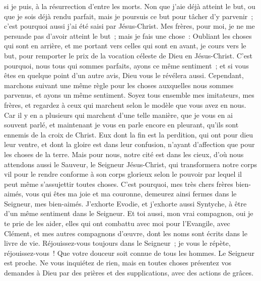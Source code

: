 \begin{multicols}{2}
si je puis, à la résurrection d'entre les morts.
Non que j'aie déjà atteint le but, ou que je sois déjà rendu parfait, mais je poursuis ce but pour tâcher d'y parvenir~; c'est pourquoi aussi j'ai été saisi par Jésus-Christ.
Mes frères, pour moi, je ne me persuade pas d'avoir atteint le but~;
mais je fais une chose~: Oubliant les choses qui sont en arrière, et me portant vers celles qui sont en avant, je cours vers le but, pour remporter le prix de la vocation céleste de Dieu en Jésus-Christ.
C'est pourquoi, nous tous qui sommes parfaits, ayons ce même sentiment~; et si vous êtes en quelque point d'un autre avis, Dieu vous le révélera aussi.
Cependant, marchons suivant une même règle pour les choses auxquelles nous sommes parvenus, et ayons un même sentiment.
Soyez tous ensemble mes imitateurs, mes frères, et regardez à ceux qui marchent selon le modèle que vous avez en nous.
Car il y en a plusieurs qui marchent d'une telle manière, que je vous en ai souvent parlé, et maintenant je vous en parle encore en pleurant, qu'ils sont ennemis de la croix de Christ.
Eux dont la fin est la perdition, qui ont pour dieu leur ventre, et dont la gloire est dans leur confusion, n'ayant d'affection que pour les choses de la terre.
Mais pour nous, notre cité est dans les cieux, d'où nous attendons aussi le Sauveur, le Seigneur Jésus-Christ,
qui transformera notre corps vil pour le rendre conforme à son corps glorieux selon le pouvoir par lequel il peut même s'assujettir toutes choses.
\VerseOne{}C'est pourquoi, mes très chers frères bien-aimés, vous qui êtes ma joie et ma couronne, demeurez ainsi fermes dans le Seigneur, mes bien-aimés.
J'exhorte Evodie, et j'exhorte aussi Syntyche, à être d'un même sentiment dans le Seigneur.
Et toi aussi, mon vrai compagnon, oui je te prie de les aider, elles qui ont combattu avec moi pour l'Evangile, avec Clément, et mes autres compagnons d'œuvre, dont les noms sont écrits dans le livre de vie.
Réjouissez-vous toujours dans le Seigneur~; je vous le répète, réjouissez-vous~!
Que votre douceur soit connue de tous les hommes. Le Seigneur est proche.
Ne vous inquiétez de rien, mais en toutes choses présentez vos demandes à Dieu par des prières et des supplications, avec des actions de grâces.

\end{multicols}
